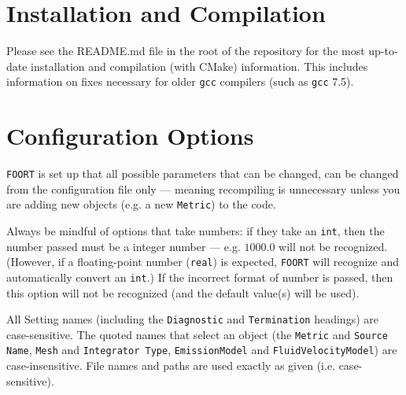 \documentclass[11pt,a4paper]{article}
\newcommand{\code}[1]{{\tt #1}}
\begin{document}



\section{Installation and Compilation}

Please see the README.md file in the root of the repository for the most up-to-date installation and compilation (with CMake) information. This includes information on fixes necessary for older \code{gcc} compilers (such as \code{gcc} 7.5).

\section{Configuration Options}\label{sec:config}

\code{FOORT} is set up that all possible parameters that can be changed, can be changed from the configuration file only --- meaning recompiling is unnecessary unless you are adding new objects (e.g. a new \code{Metric}) to the code.

Always be mindful of options that take numbers: if they take an \code{int}, then the number passed must be a integer number --- e.g. $1000.0$ will not be recognized. (However, if a floating-point number (\code{real}) is expected, \code{FOORT} will recognize and automatically convert an \code{int}.) If the incorrect format of number is passed, then this option will not be recognized (and the default value(s) will be used).

All Setting names (including the \code{Diagnostic} and \code{Termination} headings) are case-sensitive. The quoted names that select an object (the \code{Metric} and \code{Source Name}, \code{Mesh} and \code{Integrator Type}, \code{EmissionModel} and \code{FluidVelocityModel}) are case-insensitive. File names and paths are used exactly as given (i.e. case-sensitive).
\end{document}
